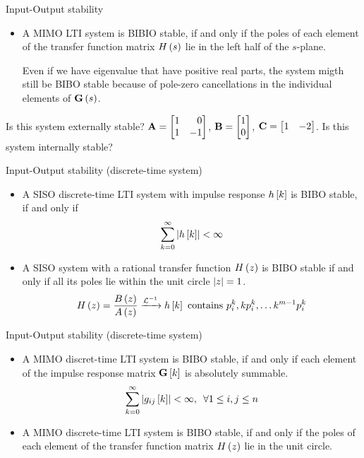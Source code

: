 \documentclass[aspectratio=169]{beamer}
\def\mf{\ensuremath\mathbf}
\def\lp{\ensuremath\left(}
\def\rp{\ensuremath\right)}
\def\lv{\ensuremath\left\lvert}
\def\rv{\ensuremath\right\rvert}
\def\ls{\ensuremath\left[}
\def\rs{\ensuremath\right]}
\def\bmx{\ensuremath\begin{bmatrix*}[r]}
\def\emx{\ensuremath\end{bmatrix*}}
\newcommand{\ct}[1]{\lp #1\rp}
\newcommand{\dt}[1]{\ls #1\rs}
\begin{document}
\begin{frame}[t]{Input-Output stability}
\begin{itemize}
    \item A MIMO LTI system is BIBIO stable, if and only if the poles of each element of the transfer function matrix $H\ct{s}$ lie in the left half of the $s$-plane.

    Even if we have eigenvalue that have positive real parts, the system migth still be BIBO stable because of pole-zero cancellations in the individual elements of $\mf{G}\ct{s}$.
\end{itemize}

Is this system externally stable? $\mf{A} = \bmx 1 & 0\\ 1 & -1\emx$, $\mf{B} = \bmx 1 \\ 0\emx$, $\mf{C} = \bmx 1 & -2\emx$. Is this system internally stable?
\end{frame} 


\begin{frame}{Input-Output stability (discrete-time system)}
\begin{itemize}
    \item A SISO discrete-time LTI system with impulse response $h\dt{k}$ is BIBO stable, if and only if
    \[ \sum_{k=0}^{\infty} \lv h\dt{k}\rv < \infty \]

    \item A SISO system with a rational transfer function $H\ct{z}$ is BIBO stable if and only if all its poles lie within the unit circle $\lv z\rv = 1$.
    \[ H\ct{z} = \frac{B\ct{z}}{A\ct{z}} \xrightarrow{\mathcal{L}^{-1}} h\dt{k} \text{ contains } p_i^k, kp_i^k, \ldots k^{m-1}p_i^k \]
\end{itemize}
\end{frame} 


\begin{frame}{Input-Output stability (discrete-time system)}
\begin{itemize}
    \item A MIMO discret-time LTI system is BIBO stable, if and only if each element of the impulse response matrix $\mf{G}\dt{k}$ is absolutely summable.
    \[ \sum_{k=0}^\infty \lv g_{ij}\dt{k}\rv < \infty , \,\,\, \forall 1 \leq i, j \leq n \]

    \item A MIMO discrete-time LTI system is BIBO stable, if and only if the poles of each element of the transfer function matrix $H\ct{z}$ lie in the unit circle.
\end{itemize}
\end{frame} 
\end{document}
